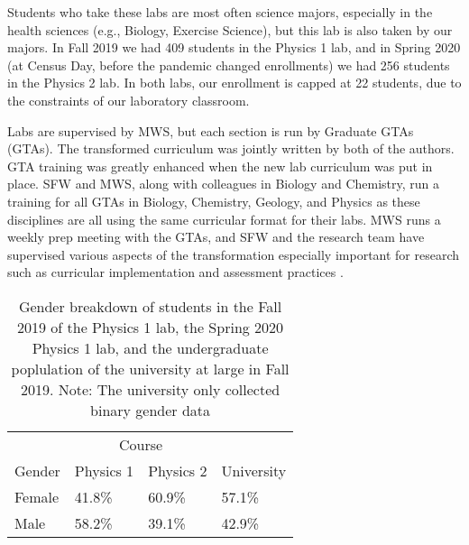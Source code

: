 \documentclass[aip, numerical, preprint]{revtex4-2}
\begin{document}
Students who take these labs are most often science majors, especially in the health sciences
(e.g., Biology, Exercise Science), but this lab is also taken by our majors.  In Fall 2019 we
had 409 students in the Physics 1 lab, and in Spring 2020 (at Census Day, before the pandemic
changed enrollments) we had 256 students in the Physics 2 lab.  In both labs, our enrollment is
capped at 22 students, due to the constraints of our laboratory classroom.

Labs are supervised by MWS, but each section is run by Graduate GTAs (GTAs). The transformed
curriculum was jointly written by both of the authors.  GTA training was greatly enhanced when
the new lab curriculum was put in place.  SFW and MWS, along with colleagues in Biology and
Chemistry, run a training for all GTAs in Biology, Chemistry, Geology, and Physics as these
disciplines are all using the same curricular format for their labs.  MWS runs a weekly prep
meeting with the GTAs, and SFW and the research team have supervised various aspects of the
transformation especially important for research such as curricular implementation \cite{AL's
  paper} and assessment practices \cite{Wolf2019}.


\begin{table}
  \centering
  \begin{tabular}{l|ll|l}
    \hline \hline							
    &	\multicolumn{2}{c|}{Course}\\
    Gender	&	Physics 1	&	Physics 2	&	University	\\ \hline
    Female	&	41.8\%	&	60.9\%	&	57.1\%	\\
    Male	&	58.2\%	&	39.1\%	&	42.9\%	\\
    \hline \hline							
  \end{tabular}
  \caption{Gender breakdown of students in the Fall 2019 of the Physics 1 lab, the Spring 2020
    Physics 1 lab, and the undergraduate poplulation of the university at large in Fall 2019.
    Note: The university only collected binary gender data }
  \label{tab:gender}
\end{table}
\end{document}
